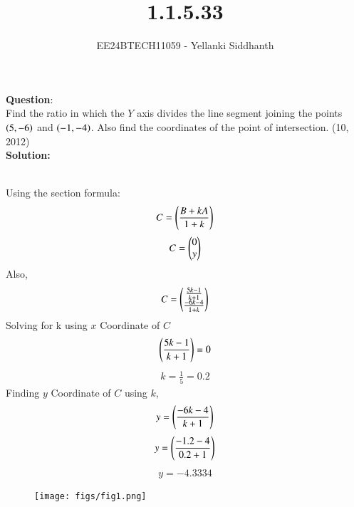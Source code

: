 \documentclass[journal]{IEEEtran}
\begin{document}

\vspace{3cm}

\title{1.1.5.33}
\author{EE24BTECH11059 - Yellanki Siddhanth
}
{\let\newpage\relax\maketitle}

\renewcommand{\thefigure}{\theenumi}
\renewcommand{\thetable}{\theenumi}
\setlength{\intextsep}{10pt} %


\renewcommand{\thetable}{\theenumi}


\textbf{Question}:\\
Find the ratio in which the $Y$ axis divides the line segment joining the points $\left(5, -6\right)$
and $\left(-1, -4\right)$. Also find the coordinates of the point of intersection. \hfill (10, 2012)
\\ \textbf{Solution: }\\
    \begin{table}[h!]    
      \centering
      
      \caption{}
    \end{table}\\
Using the section formula:
    \begin{align}
        C  = \left(\frac{B + kA}{1 + k}\right) \label{eq1.1.5.33.1}
    \end{align}
    \begin{align}
        C = \begin{pmatrix}0 \\ y\end{pmatrix} \label{eq1.1.5.33.2}
    \end{align}
Also,
    \begin{align}
        C = \begin{pmatrix}\frac{5k-1}{k+1} \\ \frac{-6k-4}{1+k}\end{pmatrix} \label{eq1.1.5.33.3}
    \end{align}
Solving for k using $x$ Coordinate of $C$
    \begin{align}
        \left(\frac{5k-1}{k+1}\right) = 0  \label{eq1.1.5.33.4}
    \end{align}
    \begin{align}
        k = \frac{1}{5} = 0.2\label{eq1.1.5.33.5}
    \end{align}
Finding $y$ Coordinate of $C$ using $k$,
    \begin{align}
        y = \left(\frac{-6k-4}{k+1}\right)  \label{eq1.1.5.33.6}
    \end{align}
    \begin{align}
        y = \left(\frac{-1.2-4}{0.2+1}\right) \label{eq1.1.5.33.7}
    \end{align}
    \begin{align}
        y = -4.3334 \label{eq1.1.5.33.8}
    \end{align}
    \begin{figure}[h]
        \centering
       \texttt{[image: figs/fig1.png]}
       \caption{}
       \label{graph}
    \end{figure}
\end{document}
